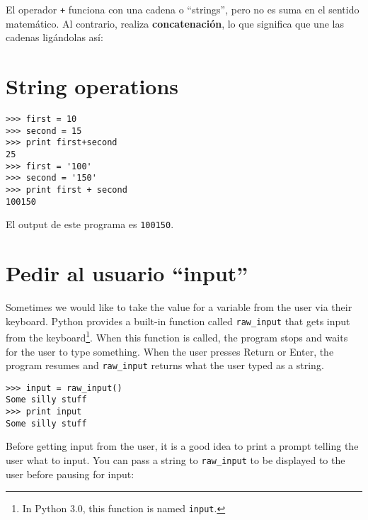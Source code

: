 \begin{ex}
El operador {\tt +} funciona con una cadena o ``strings'', pero no es suma en el sentido matem\'atico. Al contrario, realiza 
{\bf concatenaci\'on}, lo que significa que une las cadenas lig\'andolas as\'i:












\section{String operations}



\beforeverb
\begin{verbatim}
>>> first = 10
>>> second = 15
>>> print first+second
25
>>> first = '100'
>>> second = '150'
>>> print first + second
100150
\end{verbatim}
\afterverb
%

El output de este programa es {\tt 100150}.

\section{Pedir al usuario ``input''}


Sometimes we would like to take the value for a variable from the user
via their keyboard.
Python provides a built-in function called \verb"raw_input" that gets
input from the keyboard\footnote{In Python 3.0, this function is named
  {\tt input}.}.  When this function is called, the program stops and
waits for the user to type something.  When the user presses {\sf
  Return} or {\sf Enter}, the program resumes and \verb"raw_input"
returns what the user typed as a string.


\beforeverb
\begin{verbatim}
>>> input = raw_input()
Some silly stuff
>>> print input
Some silly stuff
\end{verbatim}
\afterverb
%
Before getting input from the user, it is a good idea to print a
prompt telling the user what to input.  You can pass a string
to \verb"raw_input" to be displayed to the user before pausing
for input:


\end{ex}
